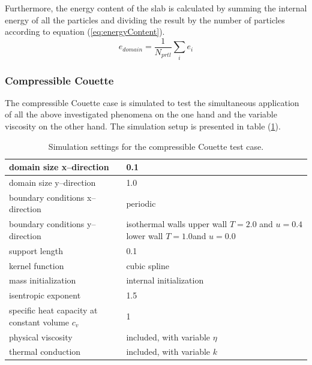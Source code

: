 \documentclass[11pt,a4paper,twoside]{report}
\begin{document}
Furthermore, the energy content of the slab is calculated by summing the internal energy of all the particles and dividing the result by the number of particles according to equation (\ref{eq:energyContent}).
\begin{equation}
 \label{eq:energyContent}
e_{\mathit{domain}}=\frac{1}{N_{\mathit{prtl}}}\sum_i e_i
\end{equation}


\subsubsection{Compressible Couette}
\label{sec:SimuSetup_ComprCouette}
The compressible Couette case is simulated to test the simultaneous application of all the above investigated phenomena on the one hand and the variable viscosity on the other hand. The simulation setup is presented in table (\ref{tab:SimuSettings_comprCouette}).

\begin{table}[h] %
\label{tab:SimuSettings_comprCouette}
\centering

\begin{tabular}[c]{|l|p{5cm}|} %
\hline
\hline
domain size x--direction &  0.1\\
\hline
domain size y--direction &  1.0\\
\hline
boundary conditions x--direction & periodic\\
\hline
boundary conditions y--direction & isothermal walls\newline
upper wall $T=2.0$ and $u=0.4$\newline lower wall $T=1.0$and $u=0.0$\\
\hline
support length & 0.1  \\
\hline
kernel function & cubic spline \\
\hline
mass initialization & internal initialization \\
\hline
isentropic exponent & 1.5\\
\hline
specific heat capacity at constant volume  $c_v$ & 1 \\
\hline
physical viscosity& included, with variable $\eta$\\ 
\hline
thermal conduction& included, with variable $k$\\ 
\hline
\hline
\end{tabular}
\caption[]{Simulation settings for the compressible Couette test case.}

\end{table}
\end{document}
